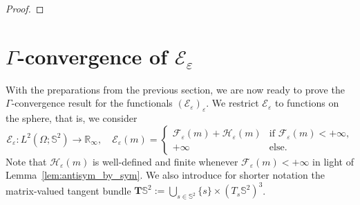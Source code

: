 \documentclass[reqno,11pt]{amsart}
\numberwithin{equation}{section}
\theoremstyle{thmlemcorr}
\numberwithin{theorem}{section}
\theoremstyle{thmlemcorr*}
\theoremstyle{defi}
\theoremstyle{remexample}
\theoremstyle{ass}
\newcommand{\R}{\mathbb{R}}
\renewcommand{\S}{\mathbb{S}}
\newcommand{\Ecal}{\mathcal{E}}
\newcommand{\Fcal}{\mathcal{F}}
\newcommand{\Hcal}{\mathcal{H}}
\renewcommand{\epsilon}{\varepsilon}
\newcommand{\dd}{\,\mathrm{d}}
\newcommand{\1}{\mathds{1}}
\DeclareMathOperator{\supp}{supp}
\newcommand{\Om}{\Omega}
\newcommand{\veps}{\varepsilon}
\newcommand{\ROSS}[1]{{\textcolor{blue}{$\langle\hspace{-0.3ex}\langle$Ross: #1$\rangle\hspace{-0.3ex}\rangle$}}}
\begin{document}
\begin{proof}
\end{proof}

\section{\texorpdfstring{$\Gamma$}{Gamma}-convergence of \texorpdfstring{$\Ecal_\epsilon$}{Fcal + Hcal}}\label{sec:gammalim}

With the preparations from the previous section, we are now ready to prove the $\Gamma$-convergence result for the functionals $(\Ecal_\epsilon)_\epsilon$. %
We restrict $\Ecal_\epsilon$ to functions on the sphere, that is, we consider
\begin{equation}\label{energies-Gammaconv}
\Ecal_\epsilon:L^2(\Omega;\S^2) \to \R_{\infty}, \quad \Ecal_\epsilon(m)=\begin{cases}
    \Fcal_\epsilon(m)+\Hcal_\epsilon(m) &\text{if $\Fcal_\epsilon(m)<+\infty$,}\\
    +\infty &\text{else}.
\end{cases}
\end{equation}
Note that $\Hcal_\epsilon(m)$ is well-defined and finite whenever $\Fcal_\epsilon(m)<+\infty$ in light of Lemma~\ref{lem:antisym_by_sym}. We also introduce for shorter notation the matrix-valued tangent bundle $\mathbf{T}\S^2:=\bigcup_{s \in \S^2}\{s\} \times (T_s\S^2)^3$.
\end{document}
